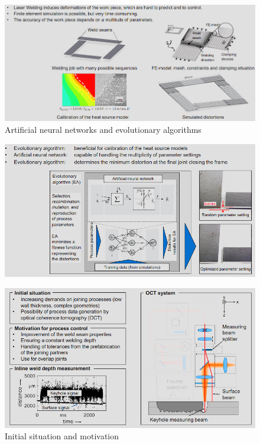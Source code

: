 \documentclass[12pt, a4paper, oneside, justified]{article}
\begin{document}
\begin{figure}[htbp]
    \centering
    \includegraphics[scale=1]{../img/1-5.png}
    \caption{Artificial neural networks and evolutionary algorithms}
    \label{img/1-5}
\end{figure}
\begin{figure}[htbp]
    \centering
    \includegraphics[scale=1]{../img/1-6.png}
    \label{img/1-6}
\end{figure}
\begin{figure}[htbp]
    \centering
    \includegraphics[scale=1]{../img/1-7.png}
    \caption{Initial situation and motivation}
    \label{img/1-7}
\end{figure}
\end{document}
